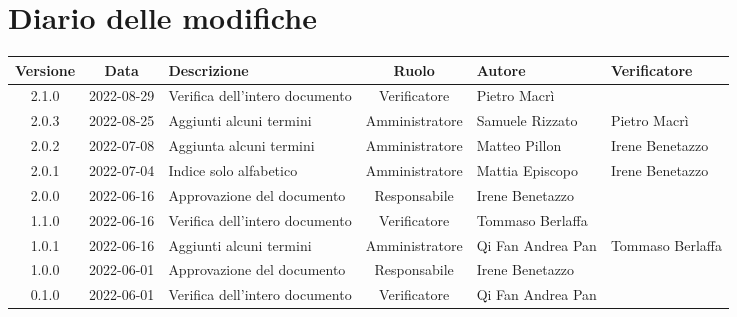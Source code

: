 \section*{Diario delle modifiche}
	\begin{center}
	\renewcommand{\arraystretch}{1.8} %
	\begin{longtable}{ |c|c|p{8em}|c|m{5em}|m{6em}| }
	\hline %
	\textbf{Versione} & \textbf{Data} & \textbf{Descrizione} &  \textbf{Ruolo} &  \textbf{Autore} & \textbf{Verificatore}\\ %
	\hline
	2.1.0 & 2022-08-29 & Verifica dell'intero documento & Verificatore & Pietro \newline Macrì & \\
    \hline
    2.0.3 & 2022-08-25 & Aggiunti alcuni termini & Amministratore & Samuele \newline Rizzato & Pietro \newline Macrì\\
    \hline
    2.0.2 & 2022-07-08 & Aggiunta alcuni termini & Amministratore & Matteo \newline Pillon & Irene \newline Benetazzo \\
	\hline
	2.0.1 & 2022-07-04 & Indice solo alfabetico & Amministratore & Mattia \newline Episcopo & Irene \newline Benetazzo \\
	\hline
    2.0.0 & 2022-06-16 & Approvazione del documento & Responsabile & Irene \newline Benetazzo & \\
	\hline
	1.1.0 & 2022-06-16 & Verifica dell'intero documento & Verificatore & Tommaso \newline Berlaffa & \\
	\hline
	1.0.1 & 2022-06-16 & Aggiunti alcuni termini & Amministratore & Qi Fan \newline Andrea Pan &  Tommaso \newline Berlaffa \\
	\hline 
	1.0.0 & 2022-06-01 & Approvazione del documento & Responsabile & Irene \newline Benetazzo & \\
	\hline
	0.1.0 & 2022-06-01 & Verifica dell'intero documento & Verificatore & Qi Fan \newline Andrea Pan & \\

\end{longtable}
\end{center}
